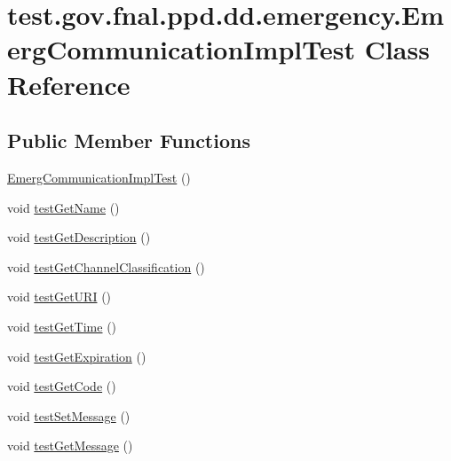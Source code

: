 \hypertarget{classtest_1_1gov_1_1fnal_1_1ppd_1_1dd_1_1emergency_1_1EmergCommunicationImplTest}{\section{test.\-gov.\-fnal.\-ppd.\-dd.\-emergency.\-Emerg\-Communication\-Impl\-Test Class Reference}
\label{classtest_1_1gov_1_1fnal_1_1ppd_1_1dd_1_1emergency_1_1EmergCommunicationImplTest}
}
\subsection*{Public Member Functions}
\begin{DoxyCompactItemize}
\item 
\hyperlink{classtest_1_1gov_1_1fnal_1_1ppd_1_1dd_1_1emergency_1_1EmergCommunicationImplTest_ae0a78af71e0ca3924851c23a036ab66e}{Emerg\-Communication\-Impl\-Test} ()
\item 
void \hyperlink{classtest_1_1gov_1_1fnal_1_1ppd_1_1dd_1_1emergency_1_1EmergCommunicationImplTest_a8257ba7e4d40647260a1abfd292ee65b}{test\-Get\-Name} ()
\item 
void \hyperlink{classtest_1_1gov_1_1fnal_1_1ppd_1_1dd_1_1emergency_1_1EmergCommunicationImplTest_a581e1971f4a3822e63feb78cd71e67a9}{test\-Get\-Description} ()
\item 
void \hyperlink{classtest_1_1gov_1_1fnal_1_1ppd_1_1dd_1_1emergency_1_1EmergCommunicationImplTest_a62fa8c9655ad1c5d47cd03e97e07fe25}{test\-Get\-Channel\-Classification} ()
\item 
void \hyperlink{classtest_1_1gov_1_1fnal_1_1ppd_1_1dd_1_1emergency_1_1EmergCommunicationImplTest_a221b3b35ffc4878b569910d6310b91d7}{test\-Get\-U\-R\-I} ()
\item 
void \hyperlink{classtest_1_1gov_1_1fnal_1_1ppd_1_1dd_1_1emergency_1_1EmergCommunicationImplTest_aef65ee1306dd31c93030697d1c734690}{test\-Get\-Time} ()
\item 
void \hyperlink{classtest_1_1gov_1_1fnal_1_1ppd_1_1dd_1_1emergency_1_1EmergCommunicationImplTest_a9bfddb5d97194f1d7d905d16871bd927}{test\-Get\-Expiration} ()
\item 
void \hyperlink{classtest_1_1gov_1_1fnal_1_1ppd_1_1dd_1_1emergency_1_1EmergCommunicationImplTest_a3177e34adca3dc093cf392b6ba045b10}{test\-Get\-Code} ()
\item 
void \hyperlink{classtest_1_1gov_1_1fnal_1_1ppd_1_1dd_1_1emergency_1_1EmergCommunicationImplTest_a4f9b92211809ec8387da389f697e1e1f}{test\-Set\-Message} ()
\item 
void \hyperlink{classtest_1_1gov_1_1fnal_1_1ppd_1_1dd_1_1emergency_1_1EmergCommunicationImplTest_a10f626630b26c221f1c288c12e0b8d37}{test\-Get\-Message} ()
\end{DoxyCompactItemize}


